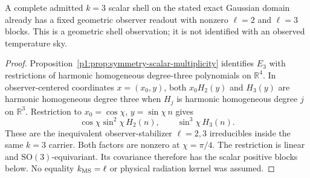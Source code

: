 \documentclass[12pt,a4paper]{article}
\begin{document}
\begin{proposition}
\label{p8:prop:v2189-sky-k3-observer}
A complete admitted $k=3$ scalar shell on the stated exact Gaussian
domain already has a fixed geometric observer readout with nonzero
$\ell=2$ and $\ell=3$ blocks. This is a geometric shell observation;
it is not identified with an observed temperature sky.
\end{proposition}
\begin{proof}
Proposition~\ref{p1:prop:symmetry-scalar-multiplicity} identifies $E_3$
with restrictions of harmonic homogeneous degree-three polynomials on
$\mathbb R^4$. In observer-centered coordinates $x=(x_0,y)$, both
$x_0H_2(y)$ and $H_3(y)$ are harmonic homogeneous degree three when
$H_j$ is harmonic homogeneous degree $j$ on $\mathbb R^3$.
Restriction to $x_0=\cos\chi$, $y=\sin\chi\,n$ gives
\[
 \cos\chi\sin^2\chi\,H_2(n),\qquad
 \sin^3\chi\,H_3(n).
\]
These are the inequivalent observer-stabilizer $\ell=2,3$ irreducibles
inside the same $k=3$ carrier. Both factors are nonzero at $\chi=\pi/4$.
The restriction is linear and $\mathrm{SO}(3)$-equivariant. Its covariance
therefore has the scalar positive blocks below. No equality
$k_{\rm MS}=\ell$ or physical radiation kernel was assumed.
\end{proof}
\end{document}
